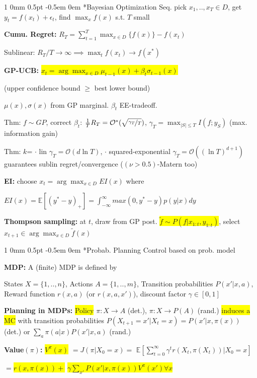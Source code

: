 \documentclass[11pt,landscape,a4paper,fleqn]{article}
\makeatletter
\newcommand*{\rsection}{%
	\@startsection{section}%
	{1}%
	{0mm}%
	{0.5pt}%
	{-0.5em \@plus 0em}
	{\color{myorange}\sffamily\small\bfseries}}
\newcommand{\mhl}[1]{\setlength{\fboxsep}{0pt}\colorbox{yellow}{#1}}
\makeatother
\begin{document}
\begin{multicols*}{4}
\vspace*{1mm}
\rsection*{Bayesian Optimization} Seq. pick $x_1,..,x_T \in D$, get $y_t = f(x_t) + \epsilon_t$, find $\max_x f(x)$ s.t. $T$ small

\textbf{Cumu. Regret:} $R_T = \sum_{t=1}^{T} \max_{x \in D} \{f(x)\} - f(x_t)$

Sublinear: $R_T/T\rightarrow\infty\implies \max_t f(x_t)\rightarrow f(x^*)$

\textbf{GP-UCB:} \mhl{$x_t = \arg\max_{x \in D} \mu_{t-1}(x) + \beta_t \sigma_{t-1}(x)$}

(upper confidence bound $\geq$ best lower bound)

$\mu(x), \sigma(x)$ from GP marginal. $\beta_t$ EE-tradeoff.

Thm: $f \sim GP$, correct $\beta_t$: $\frac{1}{T}R_T = \mathcal{O}^*(\sqrt{\nicefrac{\gamma_T}{T}})$, $\gamma_T = \max_{|S| \leq T} I(f; y_S)$ (max. information gain)

Thm: $k$= $\cdot$ lin $\gamma_T=\mathcal{O}(d\ln T)$, $\cdot$ squared-exponential  $\gamma_T=\mathcal{O}((\ln T)^{d+1})$ guarantees sublin regret/convergence ($(\nu>0.5)$-Matern too)

\textbf{EI:} choose $x_t = \arg\max_{x \in D} EI(x)$ where

$EI(x) = \mathbb{E}[(y^* - y)_+] = \int_{-\infty}^{\infty} max(0, y^* - y) p(y | x) dy$



\textbf{Thompson sampling:} at $t$, draw from GP post. \mhl{$\tilde{f} \sim P(f | x_{1:t}, y_{1:t})$}, select $x_{t+1} \in \arg\max_{x \in D} \tilde{f}(x)$


\rsection*{Probab. Planning} {\fontsize{9}{6}\selectfont Control based on prob. model}

\textbf{MDP:} A (finite) MDP is defined by

States $X = \{1,..,n\}$,
Actions $A = \{1,..,m\}$,
Transition probabilities $P(x' | x,a)$,
Reward function $r(x,a)$ (or $r(x,a,x')$),
discount factor $\gamma \in [0,1]$

\textbf{Planning in MDPs:} \mhl{Policy} $\pi: X \rightarrow A$ (det.), $\pi: X \rightarrow P(A)$ (rand.) \mhl{induces a MC} with transition probabilities $P(X_{t+1} = x' | X_t = x) = P(x' | x, \pi(x))$ (det.) or $\sum_a \pi(a | x) P(x' | x, a)$ (rand.)

\textbf{Value$(\pi)$:} \mhl{$V^\pi(x)$} $ = J(\pi | X_0 = x) =$
$\mathbb{E}[\sum_{t=0}^{\infty} \gamma^t r(X_t, \pi(X_t)) | X_0 = x] $ 

$=$\mhl{$r(x, \pi(x)) +$}
\mhl{$\gamma \sum_{x'} P(x' | x, \pi(x)) V^\pi(x')\forall x$}


\end{multicols*}
\end{document}
